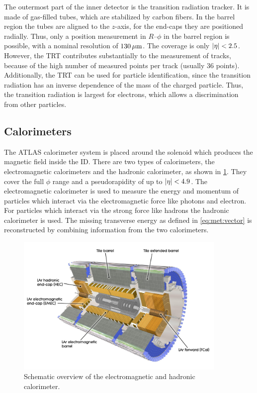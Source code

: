 The outermost part of the inner detector is the transition radiation tracker.
It is made of gas-filled tubes, which are stabilized by carbon fibers.
In the barrel region the tubes are aligned to the $z$-axis, for the end-caps they are positioned radially.
Thus, only a position measurement in $R$\nobreakdash--$\phi$ in the barrel region is possible, with a
nominal resolution of $\unit[130]{\mu m}$.
The coverage is only $\left|\eta\right| < 2.5$.
However, the TRT contributes substantially to the measurement of tracks, because of the high number of
measured points per track (usually 36 points).
Additionally, the TRT can be used for particle identification, since the transition radiation has
an inverse dependence of the mass of the charged particle.
Thus, the transition radiation is largest for electrons, which allows a discrimination from other particles.


\subsection{Calorimeters}\label{sub:setup:calorimeters}

The ATLAS calorimeter system is placed around the solenoid which produces the magnetic field inside the ID\@.
There are two types of calorimeters, the electromagnetic calorimeters and the hadronic calorimeter,
as shown in \cref{fig:setup:calo}.
They cover the full $\phi$ range and a pseudorapidity of up to $\left|\eta\right| < 4.9$.
The electromagnetic calorimeter is used to measure the energy and momentum of particles which interact via the electromagnetic force like photons and
electron.
For particles which interact via the strong force like hadrons the hadronic calorimeter is used.
The missing transverse energy as defined in \cref{eq:met:vector} is reconstructed by combining information from the two
calorimeters.

\begin{figure}[htb]
    \centering
    \includegraphics[width=0.9\textwidth]{./figures/setup/calorimeters.jpg}
    \caption{Schematic overview of the electromagnetic and hadronic calorimeter.~\cite{ImageCalo}}\label{fig:setup:calo}
\end{figure}

